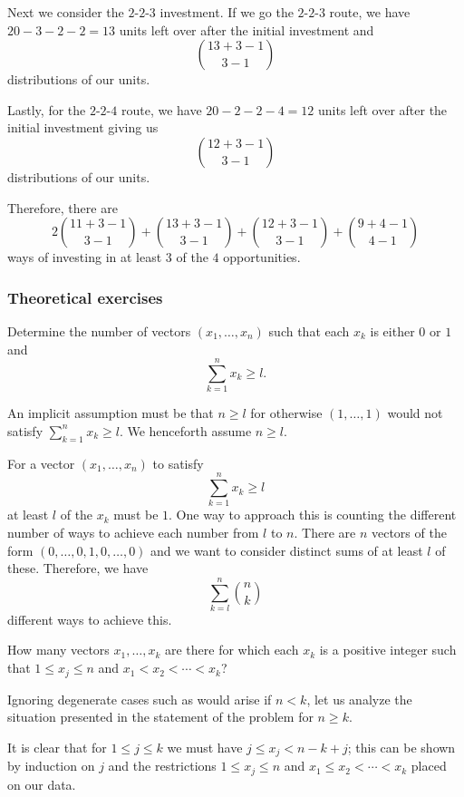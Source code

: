 \begin{solution*}
  Next we consider the \(2\)-\(2\)-\(3\) investment. If we go the
  \(2\)-\(2\)-\(3\) route, we have \(20-3-2-2=13\) units left over after
  the initial investment and
  \[
    \binom{13+3-1}{3-1}
  \]
  distributions of our units.

  Lastly, for the \(2\)-\(2\)-\(4\) route, we have \(20-2-2-4=12\) units
  left over after the initial investment giving us
  \[
    \binom{12+3-1}{3-1}
  \]
  distributions of our units.

  Therefore, there are
  \[
    2\binom{11+3-1}{3-1}
    +\binom{13+3-1}{3-1}
    +\binom{12+3-1}{3-1}
    +\binom{9+4-1}{4-1}
  \]
  ways of investing in at least \(3\) of the \(4\) opportunities.
\end{solution*}

\subsubsection{Theoretical exercises}
\begin{problem}[Ross, \S 1, \# 5]
  Determine the number of vectors \((x_1,\dotsc,x_n)\) such that each
  \(x_k\) is either \(0\) or \(1\) and
  \[
    \sum_{k=1}^n x_k\geq l.
  \]
\end{problem}
\begin{solution*}
  An implicit assumption must be that \(n\geq l\) for otherwise
  \((1,\dotsc,1)\) would not satisfy \(\sum_{k=1}^n x_k\geq l\). We
  henceforth assume \(n\geq l\).

  For a vector \((x_1,\dotsc,x_n)\) to satisfy
  \[
    \sum_{k=1}^n x_k\geq l
  \]
  at least \(l\) of the \(x_k\) must be \(1\). One way to approach this is
  counting the different number of ways to achieve each number from \(l\)
  to \(n\). There are \(n\) vectors of the form
  \((0,\dotsc,0,1,0,\dotsc,0)\) and we want to consider distinct sums of at
  least \(l\) of these. Therefore, we have
  \[
    \sum_{k=l}^n\binom{n}{k}
  \]
  different ways to achieve this.
\end{solution*}

\begin{problem}[Ross, \S 1, \# 6]
  How many vectors \(x_1,\dotsc,x_k\) are there for which each \(x_k\) is a
  positive integer such that \(1\leq x_j\leq n\) and
  \(x_1<x_2<\dotsb<x_k\)?
\end{problem}
\begin{solution*}
  Ignoring degenerate cases such as would arise if \(n<k\), let us analyze
  the situation presented in the statement of the problem for \(n\geq k\).

  It is clear that for \(1\leq j\leq k\) we must have \(j\leq x_j<n-k+j\);
  this can be shown by induction on \(j\) and the restrictions
  \(1\leq x_j\leq n\) and \(x_1\leq x_2<\dotsb<x_k\) placed on our data.
\end{solution*}

